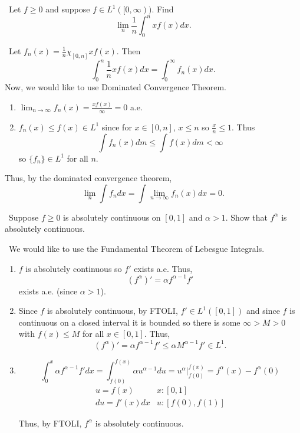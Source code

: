 \documentclass[12pt]{Qual}
\begin{document}
\begin{problem} $\,$
Let $f\ge0$ and suppose $f\in L^1([0,\infty))$. Find $$\lim_n\frac{1}{n}\int_0^nxf(x)dx.$$
\end{problem}


\begin{solution}$\,$
Let $f_n(x)=\frac{1}{n}\chi_{[0,n]}xf(x).$ Then $$\int_0^n\frac{1}{n}xf(x)dx=\int_0^\infty f_n(x)dx.$$
Now, we would like to use Dominated Convergence Theorem.
\begin{enumerate}
    \item $\displaystyle\lim_{n\to\infty}f_n(x)=\frac{xf(x)}{\infty}=0$ a.e.
    \item $f_n(x)\le f(x)\in L^1$ since for $x\in[0,n]$, $x\le n$ so $\frac{x}{n}\le 1$. Thus $$\int f_n(x)dm\le\int f(x)dm<\infty$$ so $\{f_n\}\in L^1$ for all $n$.
\end{enumerate}

Thus, by the dominated convergence theorem, $$\lim_n\int f_ndx=\int\lim_{n\to\infty}f_n(x)dx=0.$$
\end{solution}
\newpage

\begin{problem} $\,$
Suppose $f\ge0$ is absolutely continuous on $[0,1]$ and $\alpha>1$. Show that $f^\alpha$ is absolutely continuous.
\end{problem}


\begin{solution}$\,$
We would like to use the Fundamental Theorem of Lebesgue Integrals.
\begin{enumerate}
    \item $f$ is absolutely continuous so $f'$ exists a.e. Thus, $$(f^\alpha)'=\alpha f^{\alpha-1}f'$$ exists a.e. (since $\alpha>1$).
    \item Since $f$ is absolutely continuous, by FTOLI, $f'\in L^1([0,1])$ and since $f$ is continuous on a closed interval it is bounded so there is some $\infty>M>0$ with $f(x)\le M$ for all $x\in[0,1]$. Thus, $$(f^\alpha)'=\alpha f^{\alpha-1}f'\le\alpha M^{\alpha-1}f'\in L^1.$$
    \item $$\int_0^x\alpha f^{\alpha-1}f'dx=\int_{f(0)}^{f(x)}\alpha u^{\alpha-1}du=u^\alpha\bigg|_{f(0)}^{f(x)}=f^\alpha(x)-f^\alpha(0)$$ $$\begin{matrix}
    u=f(x) & x:[0,1]  \\
    du=f'(x)dx & u:[f(0),f(1)]
\end{matrix}$$

Thus, by FTOLI, $f^\alpha$ is absolutely continuous.
\end{enumerate}

\end{solution}
\newpage
\end{document}
